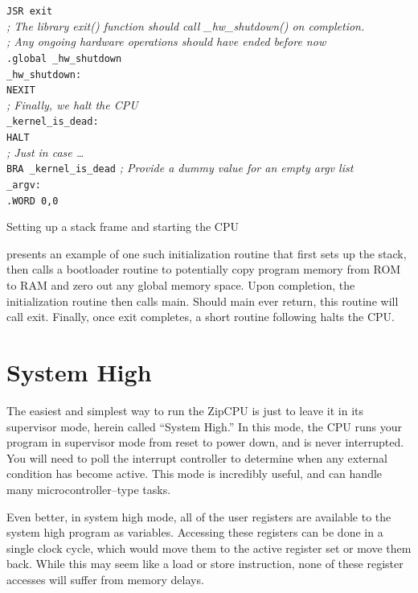 \documentclass{gqtekspec}
\begin{document}
\begin{table}
\begin{center}
\begin{tabbing}
\>	{\tt JSR	exit}\\
%
{\em ; The library exit() function should call \_hw\_shutdown() on completion.}\\
{\em ; Any ongoing hardware operations should have ended before now}\\
\>	{\tt .global \_hw\_shutdown} \\
{\tt \_hw\_shutdown:} \\
\>	{\tt NEXIT}\\
%
%
{\em ; Finally, we halt the CPU }\\
{\tt \_kernel\_is\_dead:}\\
\>	{\tt HALT}\\
\>	{\em ; Just in case \ldots}\\
\> {\tt BRA \_kernel\_is\_dead}
{\em ; Provide a dummy value for an empty argv list}\\
{\tt \_argv:} \\
\> {\tt .WORD	0,0}
\end{tabbing}
\caption{Setting up a stack frame and starting the CPU}\label{tbl:op-init}
\end{center}\end{table}
presents an example of one such initialization routine
that first sets up the stack, then calls a bootloader routine to potentially
copy program memory from ROM to RAM and zero out any global memory space.
Upon completion, the initialization routine then calls main.  Should
main ever return, this routine will call exit.  Finally, once exit completes,
a short routine following halts the CPU.

\section{System High}
The easiest and simplest way to run the ZipCPU is just to leave it in its
supervisor mode, herein called ``System High.'' In this mode, the CPU runs
your program in supervisor mode from reset to power down, and is never
interrupted.  You will need to poll the interrupt controller to determine when
any external condition has become active.  This mode is incredibly useful, and
can handle many microcontroller--type tasks. 

Even better, in system high mode, all of the user registers are available
to the system high program as variables.  Accessing these registers can be
done in a single clock cycle, which would move them to the active register
set or move them back.  While this may seem like a load or store instruction,
none of these register accesses will suffer from memory delays.
\end{document}
